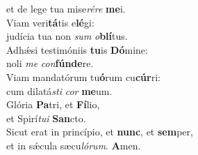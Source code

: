 \oddverse et de lege tua mise\textit{ré}\textit{re} \textbf{me}i.\\
\evenverse Viam veri\textbf{tá}tis e\textbf{lé}gi:~\*\\
\evenverse judícia tua non \textit{sum} \textit{o}\textbf{blí}tus.\\
\oddverse Adhǽsi testimóniis \textbf{tu}is \textbf{Dó}mine:~\*\\
\oddverse noli \textit{me} \textit{con}\textbf{fún}\textbf{de}re.\\
\evenverse Viam mandatórum tu\textbf{ó}rum cu\textbf{cúr}ri:~\*\\
\evenverse cum dilatá\textit{sti} \textit{cor} \textbf{me}um.\\
\oddverse Glória \textbf{Pa}tri, et \textbf{Fí}lio,~\*\\
\oddverse et Spirí\textit{tu}\textit{i} \textbf{San}cto.\\
\evenverse Sicut erat in princípio, et \textbf{nunc}, et \textbf{sem}per,~\*\\
\evenverse et in sǽcula sæcu\textit{ló}\textit{rum}. \textbf{A}men.\\
